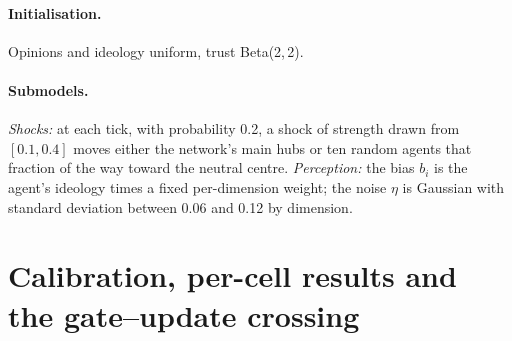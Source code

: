\documentclass[11pt]{article}
\begin{document}
\paragraph{Initialisation.} Opinions and ideology uniform, trust Beta(2,\,2).

\paragraph{Submodels.} \emph{Shocks:} at each tick, with probability 0.2, a shock of strength drawn from $[0.1,0.4]$ moves either the network's main hubs or ten random agents that fraction of the way toward the neutral centre. \emph{Perception:} the bias $b_i$ is the agent's ideology times a fixed per-dimension weight; the noise $\eta$ is Gaussian with standard deviation between 0.06 and 0.12 by dimension.

\section{Calibration, per-cell results and the gate--update crossing}
\label{app:tables}

\begin{table}[h]
\centering\scriptsize
\caption{Run-matched thresholds: the $\varepsilon$ found by bisection (3 significant figures), its pass-rate error against the Euclidean target on the 50 pilot seeds, the number of bisection steps, and the pass-rate gap to Euclidean on the 100 evaluation seeds with a paired bootstrap 95\% interval.}
\label{tab:calibration}

\end{table}

\begin{table}[h]
\centering\scriptsize
\caption{Pass-rate gap to Euclidean after 2{,}000 rounds, per cell, geometry and threshold rule: mean difference [paired bootstrap 95\% CI]; $^{=}$ marks equivalence to zero ($\pm0.02$).}
\label{tab:cells-pass}

\end{table}

\begin{table}[h]
\centering\scriptsize
\caption{Gap to Euclidean in the primary outcome (groups holding at least 1\% of agents, common ruler) after 2{,}000 rounds: mean $\log_2$ ratio [paired bootstrap 95\% CI]; $^{=}$ marks equivalence to zero ($\pm0.25$).}
\label{tab:cells-groups}

\end{table}

\begin{table}[h]
\centering\scriptsize
\caption{Share of runs not settled after 2{,}000 / 4{,}000 rounds, and median convergence time (rounds, censored at 4{,}000), for Euclidean and the run-matched angular geometries.}
\label{tab:settled}

\end{table}
\end{document}
